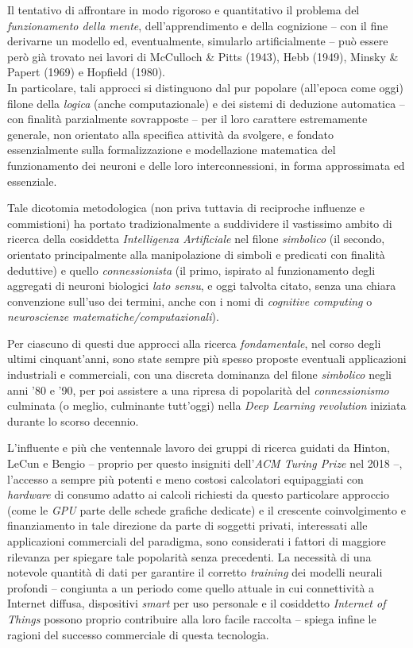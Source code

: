 \documentclass[a4paper, twoside]{article}
\begin{document}
Il tentativo di affrontare in modo rigoroso e quantitativo il problema del \textit{funzionamento della mente}, dell'apprendimento e della cognizione -- con il fine derivarne un modello ed, eventualmente, simularlo artificialmente -- può essere però già trovato nei lavori di McCulloch \& Pitts (1943), Hebb (1949), Minsky \& Papert (1969) e Hopfield (1980).\\
In particolare, tali approcci si distinguono dal pur popolare (all'epoca come oggi) filone della \textit{logica} (anche computazionale) e dei sistemi di deduzione automatica -- con finalità parzialmente sovrapposte -- per il loro carattere estremamente generale, non orientato alla specifica attività da svolgere, e fondato essenzialmente sulla formalizzazione e modellazione matematica del funzionamento dei neuroni e delle loro interconnessioni, in forma approssimata ed essenziale.

Tale dicotomia metodologica (non priva tuttavia di reciproche influenze e commistioni) ha portato tradizionalmente a suddividere il vastissimo ambito di ricerca della cosiddetta \textit{Intelligenza Artificiale} nel filone \textit{simbolico} (il secondo, orientato principalmente alla manipolazione di simboli e predicati con finalità deduttive) e quello \textit{connessionista} (il primo, ispirato al funzionamento degli aggregati di neuroni biologici \textit{lato sensu}, e oggi talvolta citato, senza una chiara convenzione sull'uso dei termini, anche con i nomi di \textit{cognitive computing} o \textit{neuroscienze matematiche/computazionali}).

Per ciascuno di questi due approcci alla ricerca \textit{fondamentale}, nel corso degli ultimi cinquant'anni, sono state sempre più spesso proposte eventuali applicazioni industriali e commerciali, con una discreta dominanza del filone \textit{simbolico} negli anni '80 e '90, per poi assistere a una ripresa di popolarità del \textit{connessionismo} culminata (o meglio, culminante tutt'oggi) nella \textit{Deep Learning revolution} iniziata durante lo scorso decennio.

L'influente e più che ventennale lavoro dei gruppi di ricerca guidati da Hinton, LeCun e Bengio -- proprio per questo insigniti dell'\textit{ACM Turing Prize} nel 2018 --, l'accesso a sempre più potenti e meno costosi calcolatori equipaggiati con \textit{hardware} di consumo adatto ai calcoli richiesti da questo particolare approccio (come le \textit{GPU} parte delle schede grafiche dedicate) e il crescente coinvolgimento e finanziamento in tale direzione da parte di soggetti privati, interessati alle applicazioni commerciali del paradigma, sono considerati i fattori di maggiore rilevanza per spiegare tale popolarità senza precedenti. La necessità di una notevole quantità di dati per garantire il corretto \textit{training} dei modelli neurali profondi -- congiunta a un periodo come quello attuale in cui connettività a Internet diffusa, dispositivi \textit{smart} per uso personale e il cosiddetto \textit{Internet of Things} possono proprio contribuire alla loro facile raccolta -- spiega infine le ragioni del successo commerciale di questa tecnologia.
\end{document}
